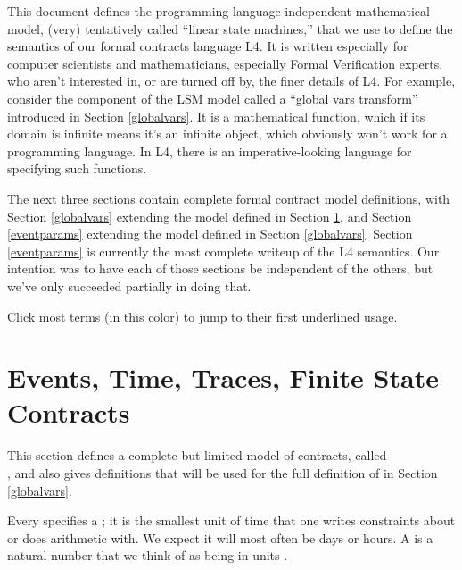 \documentclass[12pt]{article}
\begin{document}
This document defines the programming language-independent mathematical model, (very) tentatively called ``linear state machines,'' that we use to define the semantics of our formal contracts language L4. It is written especially for computer scientists and mathematicians, especially Formal Verification experts, who aren't interested in, or are turned off by, the finer details of L4. For example, consider the component of the LSM model called a ``global vars transform'' introduced in Section \ref{globalvars}. It is a mathematical function, which if its domain is infinite means it's an infinite object, which obviously won't work for a programming language. In L4, there is an imperative-looking language for specifying such functions.
 


The next three sections contain complete formal contract model definitions, with Section \ref{globalvars} extending the model defined in Section \ref{basics}, and Section \ref{eventparams} extending the model defined in Section \ref{globalvars}. Section \ref{eventparams} is currently the most complete writeup of the L4 semantics. Our intention was to have each of those sections be independent of the others, but we've only succeeded partially in doing that.

\medskip 

Click most terms (in \color{TermColor}this color\color{black}) to jump to their first underlined usage.

\section{Events, Time, Traces, Finite State Contracts} \label{basics}

This section defines a complete-but-limited model of contracts, called \\ , and also gives definitions that will be used for the full definition of  in Section \ref{globalvars}.

Every \Contract specifies a ; it is the smallest unit of time that one writes constraints about or does arithmetic with. We expect it will most often be days or hours. A  is a natural number that we think of as being in units \TimeUnit.
\end{document}
